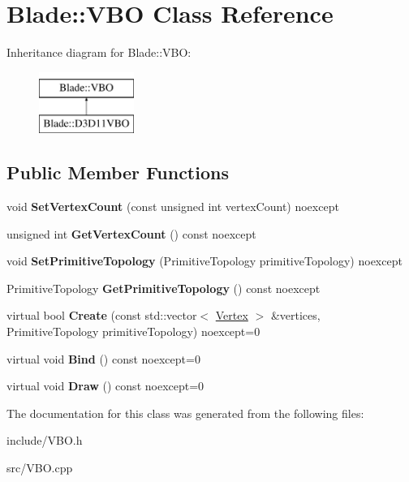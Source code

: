 \hypertarget{class_blade_1_1_v_b_o}{}\section{Blade\+:\+:V\+BO Class Reference}
\label{class_blade_1_1_v_b_o}
Inheritance diagram for Blade\+:\+:V\+BO\+:\begin{figure}[H]
\begin{center}
\leavevmode
\includegraphics[height=2.000000cm]{class_blade_1_1_v_b_o}
\end{center}
\end{figure}
\subsection*{Public Member Functions}
\begin{DoxyCompactItemize}
\item 
\mbox{\label{class_blade_1_1_v_b_o_ac0e379610db3ed043ff9baa0b0cecf7d}} 
void {\bfseries Set\+Vertex\+Count} (const unsigned int vertex\+Count) noexcept
\item 
\mbox{\label{class_blade_1_1_v_b_o_a9837ec110c38df56c8ebe496da164bd1}} 
unsigned int {\bfseries Get\+Vertex\+Count} () const noexcept
\item 
\mbox{\label{class_blade_1_1_v_b_o_af865b2c7aaa2c32752b7b18ac0cd4c6c}} 
void {\bfseries Set\+Primitive\+Topology} (Primitive\+Topology primitive\+Topology) noexcept
\item 
\mbox{\label{class_blade_1_1_v_b_o_a7367c80f68b485f3a58de16c9ae12103}} 
Primitive\+Topology {\bfseries Get\+Primitive\+Topology} () const noexcept
\item 
\mbox{\label{class_blade_1_1_v_b_o_a4705ad8bee6a1dcf52b4d7944c89fc44}} 
virtual bool {\bfseries Create} (const std\+::vector$<$ \hyperlink{struct_blade_1_1_vertex}{Vertex} $>$ \&vertices, Primitive\+Topology primitive\+Topology) noexcept=0
\item 
\mbox{\label{class_blade_1_1_v_b_o_ae532231f37b6bdef3293c162a33ed089}} 
virtual void {\bfseries Bind} () const noexcept=0
\item 
\mbox{\label{class_blade_1_1_v_b_o_ab7965801e07d1e4b3c746cdce1251c42}} 
virtual void {\bfseries Draw} () const noexcept=0
\end{DoxyCompactItemize}


The documentation for this class was generated from the following files\+:\begin{DoxyCompactItemize}
\item 
include/V\+B\+O.\+h\item 
src/V\+B\+O.\+cpp\end{DoxyCompactItemize}
